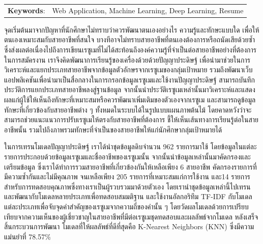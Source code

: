 \documentclass[12pt,oneside,openright,a4paper]{cpe-thai-project}
\begin{document}
\begin{flushleft}
    \begin{tabular*}{\textwidth}{@{}lp{}}
        \textbf{Keywords}: & Web Application, Machine Learning, Deep Learning, Resume
    \end{tabular*}
\end{flushleft}
\endabstract

\thaiabstract

จุดเริ่มต้นมาจากปัญหาที่นักศึกษาไม่ทราบว่าควรพัฒนาตนเองอย่างไร ความรู้และทักษะแบบใด เพื่อให้ตนเองเหมาะสมกับสายอาชีพที่สนใจ 
บางทีอาจไม่ทราบสายอาชีพที่ตนเองต้องการหรือถนัดเสียด้วยซ้ำ ซึ่งส่งผลต่อเนื่องไปถึงการเขียนเรซูเมที่ไม่ได้สะท้อนถึงองค์ความรู้ที่จำเป็นต่อสายอาชีพอย่างที่ต้องการในการสมัครงาน
เราจึงคิดพัฒนาการเรียนรู้ของเครื่องด้วยด้วยปัญญาประดิษฐ์ เพื่อนำมาช่วยในการวิเคราะห์และแยกประเภทสายอาชีพจากข้อมูลตัวอักษรจากเรซูเมของกลุ่มเป้าหมาย 
รวมถึงพัฒนาเว็บแอปพลิเคชันเพื่อนำมาเป็นสื่อกลางในการกรอกข้อมูลเรซูเมและใช้งานปัญญาประดิษฐ์ สามารถบันทึกประวัติการแยกประเภทสายอาชีพลงสู่ฐานข้อมูล จากนั้นนำประวัติเรซูเมเหล่านั้นมาวิเคราะห์และแสดงผลแก่ผู้ใช้ให้เห็นถึงทักษะที่เหมาะสมหรือควรพัฒนาเพิ่มเติมของตัวเองจากเรซูเม และสามารถดูข้อมูลทักษะที่เกี่ยวข้องกับสายอาชีพต่าง ๆ ทั้งหมดในระบบได้ในรูปแบบแผนภาพต้นไม้ โดยคาดหวังว่าจะสามารถช่วยแนะแนวการปรับเรซูเมให้ตรงกับสายอาชีพที่ต้องการ ชี้ให้เห็นเส้นทางการเรียนรู้ต่อในสายอาชีพนั้น รวมไปถึงภาพรวมทักษะที่จำเป็นของสายอาชีพให้แก่นักศึกษากลุ่มเป้าหมายได้

ในการเทรนโมเดลปัญญาประดิษฐ์ เราได้นำชุดข้อมูลดิบจำนวน 962 รายการมาใช้ โดยข้อมูลในแต่ละรายการประกอบด้วยข้อมูลเรซูเมและชื่ออาชีพของเรซูเมนั้น 
จากนั้นนำข้อมูลเหล่านั้นมาคัดกรองและเตรียมข้อมูล ซึ่งเราได้ทำการรวมสายอาชีพที่เกี่ยวข้องกันให้เหลือเพียง 6 สายอาชีพ คัดกรองรายการที่มีความซ้ำกันและไม่มีคุณภาพ 
จนเหลือเพียง 205 รายการที่เหมาะสมแก่การใช้งาน และ14 รายการสำหรับการทดสอบคุณภาพซึ่งทางเราเป็นผู้รวบรวมมาด้วยตัวเอง  
โดยเรานำชุดข้อมูลเหล่านี้ไปเทรนและพัฒนากับโมเดลหลายประเภทเพื่อทดสอบสมมติฐาน และใช้งานอัลกอริทึม TF-IDF 
กับโมเดลแต่ละประเภทเพื่อจับจุดคำสำคัญของเรซูเมจากความถี่ของคำนั้น ๆ โดยวัดผลโมเดลด้วยการเปรียบเทียบจากความเห็นของผู้เชี่ยวชาญในสายอาชีพที่มีต่อเรซูเมชุดทดสอบและผลลัพธ์จากโมเดล 
หลังเสร็จสิ้นกระบวนการพัฒนา โมเดลที่ให้ผลลัพธ์ที่ดีที่สุดคือ K-Nearest Neighbors (KNN) ซึ่งมีความแม่นยำที่ 78.57\% 
\end{document}
